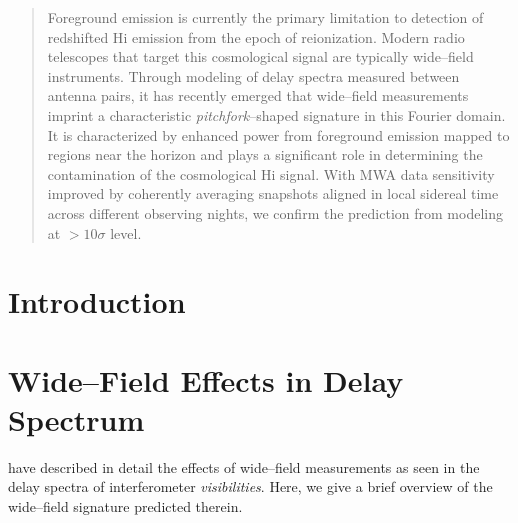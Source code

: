 \documentclass[preprint2,apjl,numberedappendix,twocolappendix,appendixfloats]{emulateapj}
\begin{document}

\begin{abstract}

Foreground emission is currently the primary limitation to detection of redshifted H{\sc i} emission from the epoch of reionization. Modern radio telescopes that target this cosmological signal are typically wide--field instruments. Through modeling of delay spectra measured between antenna pairs, it has recently emerged that wide--field measurements imprint a characteristic {\it pitchfork}--shaped signature in this Fourier domain. It is characterized by enhanced power from foreground emission mapped to regions near the horizon and plays a significant role in determining the contamination of the cosmological H{\sc i} signal. With MWA data sensitivity improved by coherently averaging snapshots aligned in local sidereal time across different observing nights, we confirm the prediction from modeling at $>10\sigma$ level. 

\end{abstract}
 

\section{Introduction}\label{sec:intro}



\section{Wide--Field Effects in Delay Spectrum}\label{sec:wide-field}

\citet{thy15} have described in detail the effects of wide--field measurements as seen in the delay spectra of interferometer {\it visibilities}. Here, we give a brief overview of the wide--field signature predicted therein. 
\end{document}
